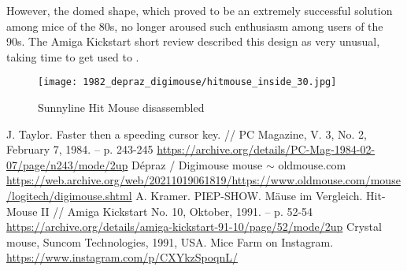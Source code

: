 \documentclass[11pt, a4paper]{article}
\begin{document}
However, the domed shape, which proved to be an extremely successful solution among mice of the 80s, no longer aroused such enthusiasm among users of the 90s. The Amiga Kickstart short review described this design as very unusual, taking time to get used to \cite{sunnyline}.

 \begin{figure}[h]
    \centering
    \texttt{[image: 1982\_depraz\_digimouse/hitmouse\_inside\_30.jpg]}
    \caption{Sunnyline Hit Mouse disassembled}
    \label{fig:HitMouseInside}
\end{figure}

\begin{thebibliography}{9}
 J. Taylor. Faster then a speeding cursor key. // PC Magazine, V. 3, No. 2, February 7, 1984. -- p. 243-245 \url{https://archive.org/details/PC-Mag-1984-02-07/page/n243/mode/2up}
 D\'epraz / Digimouse mouse $\sim$ oldmouse.com \url{https://web.archive.org/web/20211019061819/https://www.oldmouse.com/mouse/logitech/digimouse.shtml}
 A. Kramer. PIEP-SHOW. M\"ause im Vergleich. Hit-Mouse II // Amiga Kickstart No. 10, Oktober, 1991. -- p. 52-54 \url{https://archive.org/details/amiga-kickstart-91-10/page/52/mode/2up}
 Crystal mouse, Suncom Technologies, 1991, USA. Mice Farm on Instagram. \url{https://www.instagram.com/p/CXYkzSpoqnL/}
\end{thebibliography}
\end{document}
